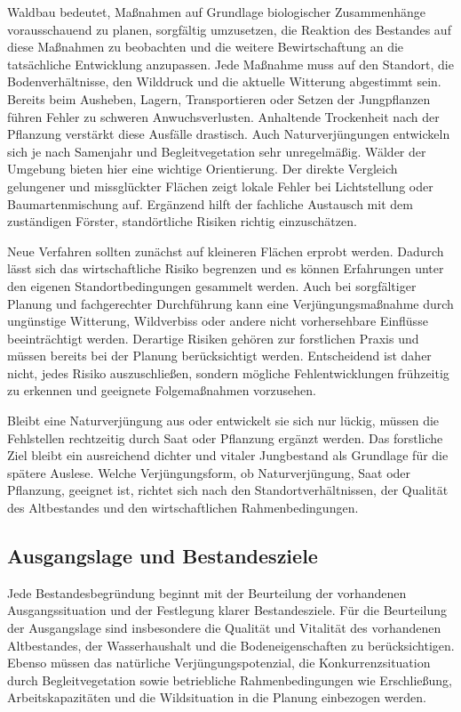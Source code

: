 \documentclass[twocolumn, bibliography=totoc, abstract=true]{scrartcl}
\begin{document}
Waldbau bedeutet, Maßnahmen auf Grundlage biologischer Zusammenhänge vorausschauend zu planen, sorgfältig umzusetzen, die Reaktion des Bestandes auf diese Maßnahmen zu beobachten und die weitere Bewirtschaftung an die tatsächliche Entwicklung anzupassen. Jede Maßnahme muss auf den Standort, die Bodenverhältnisse, den Wilddruck und die aktuelle Witterung abgestimmt sein. Bereits beim Ausheben, Lagern, Transportieren oder Setzen der Jungpflanzen führen Fehler zu schweren Anwuchsverlusten. Anhaltende Trockenheit nach der Pflanzung verstärkt diese Ausfälle drastisch. Auch Naturverjüngungen entwickeln sich je nach Samenjahr und Begleitvegetation sehr unregelmäßig. Wälder der Umgebung bieten hier eine wichtige Orientierung. Der direkte Vergleich gelungener und missglückter Flächen zeigt lokale Fehler bei Lichtstellung oder Baumartenmischung auf. Ergänzend hilft der fachliche Austausch mit dem zuständigen Förster, standörtliche Risiken richtig einzuschätzen.

Neue Verfahren sollten zunächst auf kleineren Flächen erprobt werden. Dadurch lässt sich das wirtschaftliche Risiko begrenzen und es können Erfahrungen unter den eigenen Standortbedingungen gesammelt werden. Auch bei sorgfältiger Planung und fachgerechter Durchführung kann eine Verjüngungsmaßnahme durch ungünstige Witterung, Wildverbiss oder andere nicht vorhersehbare Einflüsse beeinträchtigt werden. Derartige Risiken gehören zur forstlichen Praxis und müssen bereits bei der Planung berücksichtigt werden. Entscheidend ist daher nicht, jedes Risiko auszuschließen, sondern mögliche Fehlentwicklungen frühzeitig zu erkennen und geeignete Folgemaßnahmen vorzusehen.

Bleibt eine Naturverjüngung aus oder entwickelt sie sich nur lückig, müssen die Fehlstellen rechtzeitig durch Saat oder Pflanzung ergänzt werden. Das forstliche Ziel bleibt ein ausreichend dichter und vitaler Jungbestand als Grundlage für die spätere Auslese. Welche Verjüngungsform, ob Naturverjüngung, Saat oder Pflanzung, geeignet ist, richtet sich nach den Standortverhältnissen, der Qualität des Altbestandes und den wirtschaftlichen Rahmenbedingungen.

\subsection{Ausgangslage und Bestandesziele}

Jede Bestandesbegründung beginnt mit der Beurteilung der vorhandenen Ausgangssituation und der Festlegung klarer Bestandesziele. Für die Beurteilung der Ausgangslage sind insbesondere die Qualität und Vitalität des vorhandenen Altbestandes, der Wasserhaushalt und die Bodeneigenschaften zu berücksichtigen. Ebenso müssen das natürliche Verjüngungspotenzial, die Konkurrenzsituation durch Begleitvegetation sowie betriebliche Rahmenbedingungen wie Erschließung, Arbeitskapazitäten und die Wildsituation in die Planung einbezogen werden.
\end{document}
